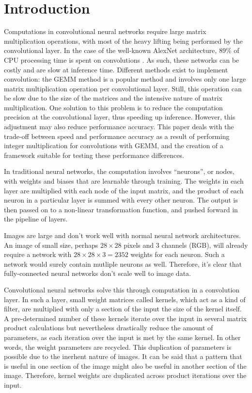 \chapter{Introduction}

Computations in convolutional neural networks require large matrix multiplication operations, with most of the heavy lifting being performed by the convolutional layer. In the case of the well-known AlexNet architecture, 89\% of CPU processing time is spent on convolutions \cite{warden_gemm}. As such, these networks can be costly and are slow at inference time. Different methods exist to implement convolution: the GEMM method is a popular method and involves only one large matrix multiplication operation per convolutional layer. Still, this operation can be slow due to the size of the matrices and the intensive nature of matrix multiplication. One solution to this problem is to reduce the computation precision at the convolutional layer, thus speeding up inference. However, this adjustment may also reduce performance accuracy. This paper deals with the trade-off between speed and performance accuracy as a result of performing integer multiplication for convolutions with GEMM, and the creation of a framework suitable for testing these performance differences.

In traditional neural networks, the computation involves ``neurons'', or nodes, with weights and biases that are learnable through training. The weights in each layer are multiplied with each node of the input matrix, and the product of each neuron in a particular layer is summed with every other neuron. The output is then passed on to a non-linear transformation function, and pushed forward in the pipeline of layers.

Images are large and don't work well with normal neural network architectures. An image of small size, perhaps $28\times28$ pixels and 3 channels (RGB), will already require a network with $28\times28\times3 = 2352$ weights for each neuron. Such a network would surely contain mutliple neurons as well. Therefore, it's clear that fully-connected neural networks don't scale well to image data.

Convolutional neural networks solve this through computation in a convolution layer. In such a layer, small weight matrices called kernels, which act as a kind of filter, are multiplied with only a section of the input the size of the kernel itself. A pre-determined number of these kernels iterate over the input in several matrix product calculations but nevertheless drastically reduce the amount of parameters, as each iteration over the input is met by the same kernel. In other words, the weight parameters are recycled. This duplication of parameters is possible due to the inerhent nature of images. It can be said that a pattern that is useful in one section of the image might also be useful in another section of the image. Therefore, kernel weights are duplicated across product iterations over the input.

